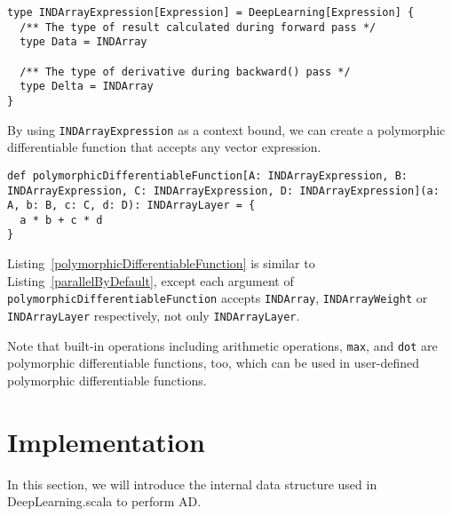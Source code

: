 \begin{lstlisting}[float={h t b p},caption={A type class alias that witnesses dense vector expressions}, label={INDArrayDeepLearning}]
type INDArrayExpression[Expression] = DeepLearning[Expression] {
  /** The type of result calculated during forward pass */
  type Data = INDArray

  /** The type of derivative during backward() pass */
  type Delta = INDArray
}
\end{lstlisting}

By using \lstinline{INDArrayExpression} as a context bound, we can create a polymorphic differentiable function that accepts any vector expression.

\begin{lstlisting}[float={h t b p},caption={A polymorphic differentiable function}, label={polymorphicDifferentiableFunction}]
def polymorphicDifferentiableFunction[A: INDArrayExpression, B: INDArrayExpression, C: INDArrayExpression, D: INDArrayExpression](a: A, b: B, c: C, d: D): INDArrayLayer = {
  a * b + c * d
}
\end{lstlisting}

Listing~\ref{polymorphicDifferentiableFunction} is similar to Listing~\ref{parallelByDefault}, except each argument of \lstinline{polymorphicDifferentiableFunction} accepts \lstinline{INDArray}, \lstinline{INDArrayWeight} or \lstinline{INDArrayLayer} respectively, not only  \lstinline{INDArrayLayer}.

Note that built-in operations including arithmetic operations, \lstinline{max}, and \lstinline{dot} are polymorphic differentiable functions, too, which can be used in user-defined polymorphic \glspl{differentiable function}.

\section{Implementation}
\label{implementation}

In this section, we will introduce the internal data structure used in DeepLearning.scala to perform AD.


